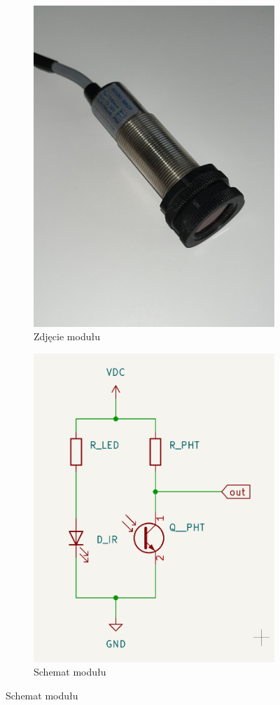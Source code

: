 \documentclass[11pt, a4paper]{article}
\begin{document}
\begin{figure}[h]
\centering
\begin{subfigure}{.5\textwidth}
\centering
\includegraphics[width=.7\linewidth]{fig/SCOO/czujnik.jpg}
\caption{Zdjęcie modułu}
\label{fig:_zdjecie_modulu}
\end{subfigure}%
\begin{subfigure}{.5\textwidth}
\centering
\includegraphics[width=.7\linewidth]{fig/SCOO/sche.png}
\caption{Schemat modułu}

\end{subfigure}
\label{fig:modul}
\end{figure}
\vspace{0.5cm}
\end{document}
